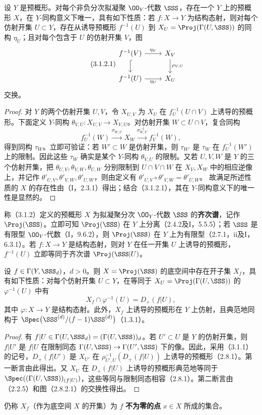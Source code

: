 设 $Y$ 是预概形。对每个非负分次拟凝聚 $\OO_Y$-代数 $\SSS$，存在一个 $Y$ 上的预概形 $X$，在 $Y$-同构意义下唯一，具有如下性质：若 $f:X\to Y$ 为结构态射，则对每个仿射开集 $U\subset Y$，存在从诱导预概形 $f^{-1}(U)$ 到 $X_U=\Proj(\Gamma(U,\SSS))$ 的同构 $\eta_U$；且对每个包含于 $U$ 的仿射开集 $V$，图
\begin{equation}\tag{3.1.2.1}
\begin{tikzcd}
f^{-1}(V) \arrow[r,"\eta_V"] \arrow[d,hook] & X_V \arrow[d,"\rho_{V,U}"]\\
f^{-1}(U) \arrow[r,"\eta_U"'] & X_U
\end{tikzcd}
\end{equation}
交换。
\begin{proof}
对 $Y$ 的两个仿射开集 $U,V$，令 $X_{U,V}$ 为 $X_U$ 在 $f_U^{-1}(U\cap V)$ 上诱导的预概形。下面定义 $Y$-同构 $\theta_{V,U}:X_{U,V}\to X_{V,U}$。对仿射开集 $W\subset U\cap V$，复合同构
\[
f_U^{-1}(W)\xrightarrow{\sigma_{W,U}}X_W
\xrightarrow{\sigma_{W,V}^{-1}}f_V^{-1}(W),
\]
得到同构 $\tau_W$。立即可验证：若 $W'\subset W$ 是仿射开集，则 $\tau_{W'}$ 是 $\tau_W$ 在 $f_U^{-1}(W')$ 上的限制。因此这些 $\tau_W$ 确实是某个 $Y$-同构 $\theta_{V,U}$ 的限制。又若 $U,V,W$ 是 $Y$ 的三个仿射开集，把 $\theta_{U,V},\theta_{V,W},\theta_{U,W}$ 分别限制到 $U\cap V\cap W$ 在 $X_V,X_W$ 中的相应逆像上，并记作 $\theta'_{U,V},\theta'_{V,W},\theta'_{U,W}$，则由定义有
$\theta'_{U,V}\circ\theta'_{V,W}=\theta'_{U,W}$。
故满足所述性质的 $X$ 的存在性由（I，2.3.1）得出；结合（3.1.2.1），其在 $Y$-同构意义下的唯一性是显然的。
\end{proof}

称（3.1.2）定义的预概形 $X$ 为拟凝聚分次 $\OO_Y$-代数 $\SSS$ 的\textbf{齐次谱}，记作 $\Proj(\SSS)$。立即可知 $\Proj(\SSS)$ 在 $Y$ 上分离（2.4.2及I，5.5.5）；若 $\SSS$ 是有限型 $\OO_Y$-代数（I，9.6.2），则 $\Proj(\SSS)$ 在 $Y$ 上为有限型（2.7.1，ii及I，6.3.1）。若 $f:X\to Y$ 是结构态射，则对 $Y$ 在任一开集 $U$ 上诱导的预概形，$f^{-1}(U)$ 立即等同于齐次谱 $\Proj(\SSS|U)$。

设 $f\in\Gamma(Y,\SSS_d)$，$d>0$。则 $X=\Proj(\SSS)$ 的底空间中存在开子集 $X_f$，具有如下性质：对每个仿射开集 $U\subset Y$，在等同于 $X_U=\Proj(\Gamma(U,\SSS))$ 的 $\varphi^{-1}(U)$ 中有
\[
X_f\cap\varphi^{-1}(U)=D_+(f|U),
\]
其中 $\varphi:X\to Y$ 是结构态射。此外，$X_f$ 上诱导的预概形在 $Y$ 上仿射，且典范地同构于
$\Spec\bigl(\SSS^{(d)}/(f-1)\SSS^{(d)}\bigr)$（1.3.1）。
\begin{proof}
有 $f|U\in\Gamma(U,\SSS_d)=(\Gamma(U,\SSS))_d$。若 $U'\subset U$ 是 $Y$ 的仿射开集，则 $f|U'$ 是 $f|U$ 在限制同态 $\Gamma(U,\SSS)\to\Gamma(U',\SSS)$ 下的像。因此，采用（3.1.1）的记号，$D_+(f|U')$ 是 $X_{U'}$ 在 $\rho_{U',U}^{-1}(D_+(f|U))$ 上诱导的预概形（2.8.1）。第一断言由此得出。又 $X_U$ 在 $D_+(f|U)$ 上诱导的预概形典范地等同于
$\Spec((\Gamma(U,\SSS))_{(f|U)})$，这些等同与限制同态相容（2.8.1）。第二断言由（2.2.5）和图（2.8.2.1）的交换性得出。
\end{proof}
仍称 $X_f$（作为底空间 $X$ 的开集）为 $f$ \textbf{不为零的点} $x\in X$ 所成的集合。

